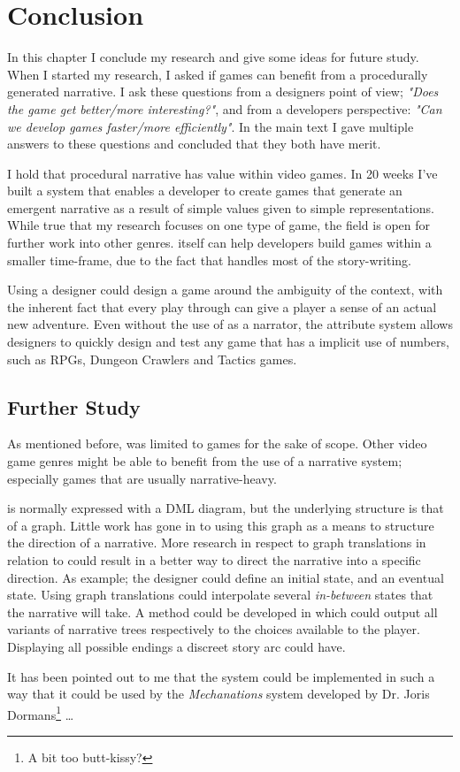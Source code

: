 \chapter{Conclusion}
In this chapter I conclude my research and give some ideas for future study.\\

When I started my research, I asked if \rogue games can benefit from a procedurally generated narrative. I ask these questions from a designers point of view; \textit{"Does the game get better/more interesting?"}, and from a developers perspective: \textit{"Can we develop games faster/more efficiently"}. In the main text I gave multiple answers to these questions and concluded that they both have merit.

I hold that procedural narrative has value within video games. In 20 weeks I've built a system that enables a developer to create games that generate an emergent narrative as a result of simple values given to simple representations. While true that my research focuses on one type of game, the field is open for further work into other genres. \diage itself can help developers build \rogue games within a smaller time-frame, due to the fact that \diage handles most of the story-writing. 

Using \diage a designer could design a game around the ambiguity of the context, with the inherent fact that every play through can give a player a sense of an actual new adventure. Even without the use of \diage as a narrator, the attribute system allows designers to quickly design and test any game that has a implicit use of numbers, such as RPGs, Dungeon Crawlers and Tactics games. 

\section{Further Study}
As mentioned before, \diage was limited to \rogue games for the sake of scope. Other video game genres might be able to benefit from the use of a narrative system; especially games that are usually narrative-heavy.

\diage is normally expressed with a DML diagram, but the underlying structure is that of a graph. Little work has gone in to using this graph as a means to structure the direction of a narrative. More research in respect to graph translations in relation to \diage could result in a better way to direct the narrative into a specific direction. As example; the designer could define an initial state, and an eventual state. Using graph translations \diage could interpolate several \textit{in-between} states that the narrative will take. A method could be developed in which \diage could output all variants of narrative trees respectively to the choices available to the player. Displaying all possible endings a discreet story arc could have. 

It has been pointed out to me that the \diage system could be implemented in such a way that it could be used by the \textit{Mechanations} system developed by Dr. Joris Dormans\footnote{A bit too butt-kissy?} \ldots